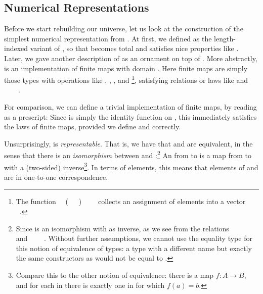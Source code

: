 \subsection{Numerical Representations}\label{sec:desc-numrep}
Before we start rebuilding our universe, let us look at the construction of the simplest numerical representation  from \bN{}. At first, we defined  as the length-indexed variant of , so that  becomes total and satisfies nice properties like . Later, we gave another description of  as an ornament on top of . More abstractly,  is an implementation of finite maps with domain . Here finite maps are simply those types with operations like , , , and \footnote{The function \ \AV{:}\ (\ \ \ )\ \ \ \  collects an assignment of elements  into a vector \ .}, satisfying relations or laws like  and \ \ \ \ .

For comparison, we can define a trivial implementation of finite maps, by reading  as a prescript:
Since  is simply the identity function on , this immediately satisfies the laws of finite maps, provided we define  and  correctly.

Unsurprisingly,  is \emph{representable}. That is, we have that  and  are equivalent, in the sense that there is an \emph{isomorphism} between  and :\footnote{Since  is an isomorphism with  as inverse, as we see from the relations \ \ \ \  and  \ \ \ \ . Without further assumptions, we cannot use the equality type  for this notion of equivalence of types: a type with a different name but exactly the same constructors as  would not be equal to .}
An  from  to  is a map from  to  with a (two-sided) inverse\footnote{Compare this to the other notion of equivalence: there is a map $f : A \to B$, and for each  in  there is exactly one  in  for which $f(a) = b$.}. In terms of elements, this means that elements of  and  are in one-to-one correspondence.

